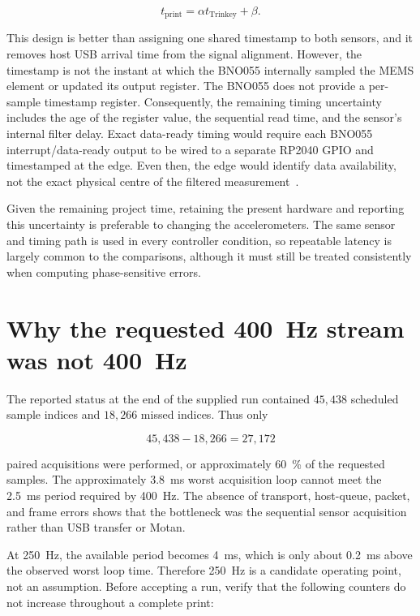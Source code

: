 \documentclass[11pt,a4paper]{article}
\begin{document}
\begin{equation}
    t_{\mathrm{print}} = \alpha t_{\mathrm{Trinkey}} + \beta .
\end{equation}

This design is better than assigning one shared timestamp to both sensors, and
it removes host USB arrival time from the signal alignment.  However, the
timestamp is not the instant at which the BNO055 internally sampled the MEMS
element or updated its output register.  The BNO055 does not provide a
per-sample timestamp register.  Consequently, the remaining timing uncertainty
includes the age of the register value, the sequential read time, and the
sensor's internal filter delay.  Exact data-ready timing would require each
BNO055 interrupt/data-ready output to be wired to a separate RP2040 GPIO and
timestamped at the edge.  Even then, the edge would identify data availability,
not the exact physical centre of the filtered measurement~\cite{bno055}.

Given the remaining project time, retaining the present hardware and reporting
this uncertainty is preferable to changing the accelerometers.  The same
sensor and timing path is used in every controller condition, so repeatable
latency is largely common to the comparisons, although it must still be treated
consistently when computing phase-sensitive errors.

\section{Why the requested \SI{400}{Hz} stream was not \SI{400}{Hz}}

The reported status at the end of the supplied run contained
\(45{,}438\) scheduled sample indices and \(18{,}266\) missed indices.  Thus
only

\begin{equation}
    45{,}438-18{,}266=27{,}172
\end{equation}

paired acquisitions were performed, or approximately \SI{60}{\percent} of the
requested samples.  The approximately \SI{3.8}{ms} worst acquisition loop
cannot meet the \SI{2.5}{ms} period required by \SI{400}{Hz}.  The absence of
transport, host-queue, packet, and frame errors shows that the bottleneck was
the sequential sensor acquisition rather than USB transfer or Motan.

At \SI{250}{Hz}, the available period becomes \SI{4}{ms}, which is only about
\SI{0.2}{ms} above the observed worst loop time.  Therefore \SI{250}{Hz} is a
candidate operating point, not an assumption.  Before accepting a run, verify
that the following counters do not increase throughout a complete print:
\end{document}
